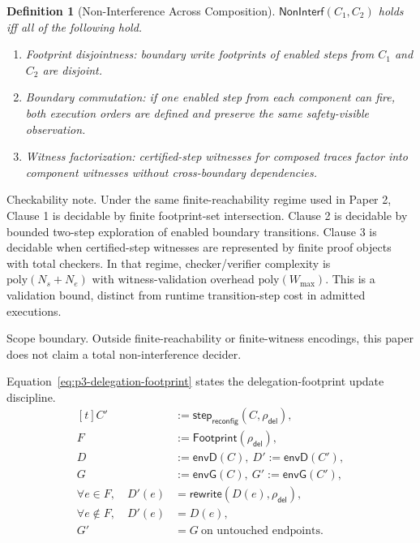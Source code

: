 \documentclass[a4paper,10pt,twocolumn,english]{article}
\numberwithin{equation}{section}
\theoremstyle{paperdef}
\newtheorem{definition}{Definition}[section]
\theoremstyle{paperplain}
\theoremstyle{paperdef}
\theoremstyle{paperremark}
\theoremstyle{paperdef}
\newcommand{\envG}{\ensuremath{\mathsf{envG}}}
\newcommand{\envD}{\ensuremath{\mathsf{envD}}}
\begin{document}
\begin{definition}[Non-Interference Across Composition]
	$\mathsf{NonInterf}(C_1,C_2)$ holds iff all of the following hold.
	\begin{enumerate}
		\item Footprint disjointness: boundary write footprints of enabled steps from $C_1$ and $C_2$ are disjoint.
		\item Boundary commutation: if one enabled step from each component can fire, both execution orders are defined and preserve the same safety-visible observation.
		\item Witness factorization: certified-step witnesses for composed traces factor into component witnesses without cross-boundary dependencies.
	\end{enumerate}
\end{definition}

Checkability note. Under the same finite-reachability regime used in Paper 2,
Clause 1 is decidable by finite footprint-set intersection. Clause 2 is
decidable by bounded two-step exploration of enabled boundary transitions. Clause
3 is decidable when certified-step witnesses are represented by finite proof
objects with total checkers. In that regime, checker/verifier complexity is
$\mathrm{poly}(N_s+N_e)$ with witness-validation overhead
$\mathrm{poly}(W_{\max})$. This is a validation bound, distinct from runtime
transition-step cost in admitted executions.

Scope boundary. Outside finite-reachability or finite-witness encodings, this
paper does not claim a total non-interference decider.

Equation~\ref{eq:p3-delegation-footprint} states the delegation-footprint update discipline.
\begin{equation}
	\label{eq:p3-delegation-footprint}
	\begin{aligned}[t]
		C'                            & := \mathsf{step}_{\mathsf{reconfig}}(C,\rho_{\mathsf{del}}), \\
		F                             & := \mathsf{Footprint}(\rho_{\mathsf{del}}),                  \\
		D                             & := \envD(C),\ D' := \envD(C'),                               \\
		G                             & := \envG(C),\ G' := \envG(C'),                               \\
		\forall e\in F,\quad D'(e)    & =\mathsf{rewrite}(D(e),\rho_{\mathsf{del}}),                 \\
		\forall e\notin F,\quad D'(e) & =D(e),                                                       \\
		G'                            & = G\ \text{on untouched endpoints.}
	\end{aligned}
\end{equation}
\end{document}
